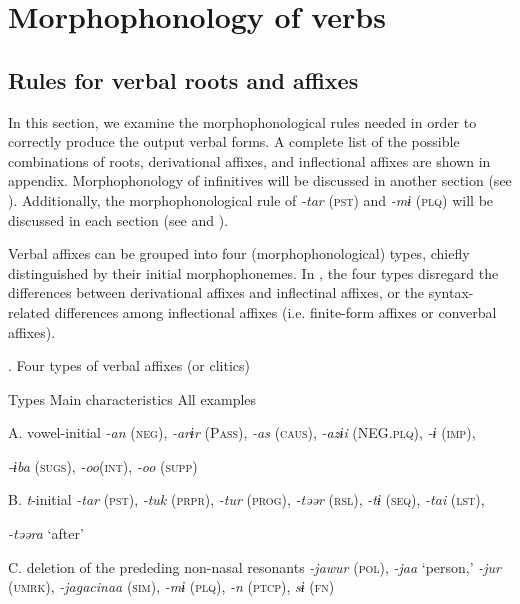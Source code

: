 \section{Morphophonology of verbs}
\label{bkm:Ref356245430}\subsection{Rules for verbal roots and affixes}

In this section, we examine the morphophonological rules needed in order to correctly produce the output verbal forms. A complete list of the possible combinations of roots, derivational affixes, and inflectional affixes are shown in appendix. Morphophonology of infinitives will be discussed in another section (see ). Additionally, the morphophonological rule of \textit{{}-tar} (\textsc{pst}) and \textit{{}-mɨ} (\textsc{plq}) will be discussed in each section (see  and ).

  Verbal affixes can be grouped into four (morphophonological) types, chiefly distinguished by their initial morphophonemes. In , the four types disregard the differences between derivational affixes and inflectinal affixes, or the syntax-related differences among inflectional affixes (i.e. finite-form affixes or converbal affixes).

\begin{styleBeschriftung}
\textmd{}\textmd{. Four types of verbal affixes (or clitics)}
\end{styleBeschriftung}

Types  Main characteristics  All examples

A.  vowel-initial  \textit{{}-an} (\textsc{neg}), \textit{{}-arɨr} (P\textsc{ass}), \textit{{}-as} (\textsc{caus}), \textit{-azɨi} (NEG.\textsc{plq}), \textit{{}-ɨ} (\textsc{imp}),

\textit{{}-ɨba} (\textsc{sugs}), \textit{-oo}(\textsc{int}), \textit{-oo} (\textsc{supp})

B.  \textit{t}{}-initial  \textit{{}-tar} (\textsc{pst}), \textit{{}-tuk} (\textsc{prpr}), \textit{{}-tur} (\textsc{prog}), \textit{{}-təər} (\textsc{rsl}), \textit{{}-tɨ} (\textsc{seq}), \textit{{}-tai} (\textsc{lst}),

\textit{{}-təəra} ‘after’

C.  deletion of the prededing non-nasal resonants  \textit{{}-jawur} (\textsc{pol}), \textit{{}-jaa} ‘person,’ \textit{{}-jur} (\textsc{umrk}), \textit{{}-jagacinaa} (\textsc{sim}), \textit{{}-mɨ} (\textsc{plq}), \textit{{}-n} (\textsc{ptcp}), \textit{sɨ} (\textsc{fn})


